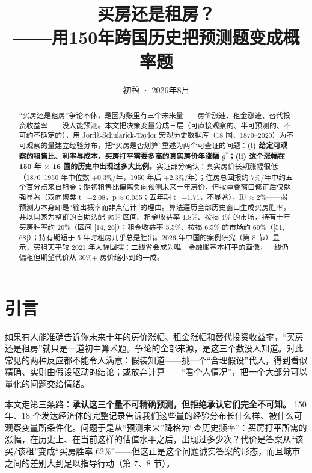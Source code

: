 \documentclass[11pt,a4paper]{ctexart}
\title{\bfseries 买房还是租房？\\ \Large ——用150年跨国历史把预测题变成概率题}
\author{}
\date{初稿 · 2026年8月}
\begin{document}
\maketitle

\begin{abstract}

\noindent ``买房还是租房''争论不休，是因为账里有三个未来量——房价涨速、租金涨速、替代投资收益率——没人能预测。本文把决策变量分成三层（可直接观察的、半可预测的、不可约不确定的），用 Jordà-Schularick-Taylor 宏观历史数据库（18 国、1870--2020）为不可观察的量建立经验分布，把``买房是否划算''重述为两个可查证的问题：\textbf{(i) 给定可观察的租售比、利率与成本，买房打平需要多高的真实房价年涨幅 $g^*$；(ii) 这个涨幅在 150 年 $\times$ 16 国的历史中出现过多大比例。}实证部分确认：真实房价长期涨幅很低（1870--1950 年中位数 +0.3\%/年，1950 年后 +2.3\%/年）；住房总回报约 7\%/年中约五个百分点来自租金；期初租售比偏离负向预测未来十年房价，但按重叠窗口修正后仅勉强显著（双向聚类 t=$-$2.08，p$\approx$0.055；五年期 t=$-$1.71，不显著），R²$\approx$2\%——弱预测力本身即是``输出概率而非点估计''的理由。算法遍历全部历史窗口生成买房胜率，并以国家为整群的自助法配 95\% 区间。租金收益率 1.8\%、按揭 4\% 的市场，持有十年买房胜率约 20\%（区间 [14, 26]）；租金收益率 5.5\%、按揭 6.5\% 的市场约 60\%（[51, 68]）；持有期短于 5 年时租房几乎总是胜出。2026 年中国的案例研究（第 8 节）显示，买租天平较 2021 年大幅回摆：二线省会成为唯一金融账基本打平的画像，一线仍偏租但期望代价从 30\%+ 房价缩小到约一成。

\end{abstract}

\section{引言}

如果有人能准确告诉你未来十年的房价涨幅、租金涨幅和替代投资收益率，``买房还是租房''就只是一道初中算术题。争论的全部来源，是这三个数没人知道。对此常见的两种反应都不能令人满意：假装知道——挑一个``合理假设''代入，得到看似精确、实则由假设驱动的结论；或放弃计算——``看个人情况''，把一个大部分可以量化的问题交给情绪。

本文走第三条路：\textbf{承认这三个量不可精确预测，但拒绝承认它们完全不可知。} 150 年、18 个发达经济体的完整记录告诉我们这些量的经验分布长什么样、被什么可观察变量所条件化。问题于是从``预测未来''降格为``查历史频率''：买房打平所需的涨幅，在历史上、在当前这样的估值水平之后，出现过多少次？代价是答案从``该买/该租''变成``买房胜率 62\%''——但这正是这个问题诚实答案的形态，而且城市之间的差别大到足以指导行动（第 7、8 节）。
\end{document}
